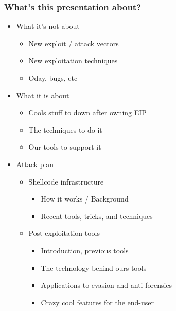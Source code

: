 \documentclass{beamer}
\newenvironment{sitemize}{\vspace{1mm}\begin{itemize}\itemsep 4pt\small}{\end{itemize}}
\begin{document}
\begin{frame}[t]
    \frametitle{What's this presentation about?}
    \begin{sitemize}
        \item What it's not about
        \begin{sitemize}
	    \item New exploit / attack vectors
	    \item New exploitation techniques
	    \item Oday, bugs, etc
        \end{sitemize}
	\pause
	\item What it is about
        \begin{sitemize}
	    \item Cools stuff to down after owning EIP
	    \item The techniques to do it
	    \item Our tools to support it
        \end{sitemize}
	\pause
	\item Attack plan
	\begin{sitemize}
	    \item Shellcode infrastructure
	    \begin{sitemize}
	        \item How it works / Background
		\item Recent tools, tricks, and techniques
            \end{sitemize}
	    \item Post-exploitation tools
	    \begin{sitemize}
	        \item Introduction, previous tools
	        \item The technology behind ours tools
		\item Applications to evasion and anti-forensics
		\item Crazy cool features for the end-user
	    \end{sitemize}
        \end{sitemize}
    \end{sitemize}
\end{frame}
\end{document}
